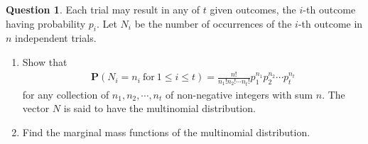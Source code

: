\documentclass[utf8]{article}
\theoremstyle{definition}%
\newtheorem{question}{Question} %
\theoremstyle{plain}%
\begin{document}
\begin{question}
    Each trial may result in any of $t$ given outcomes, the $i$-th outcome having probability $p_i$. Let $N_i$ be the number of occurrences of the $i$-th outcome in $n$ independent trials.
    \begin{enumerate}[label=(\alph*)]
        \item Show that
        \begin{align}
            \mathbf{P}(N_i = n_i~\text{for}~1 \leq i \leq t) = \frac{n!}{n_1!n_2!\cdots n_t!} p_1^{n_1} p_2^{n_2} \cdots p_t^{n_t}
        \end{align}
        for any collection of $n_1, n_2, \cdots, n_t$ of non-negative integers with sum $n$. The vector $N$ is said to have the multinomial distribution.
        \item Find the marginal mass functions of the multinomial distribution.
    \end{enumerate}
\end{question}
\end{document}
